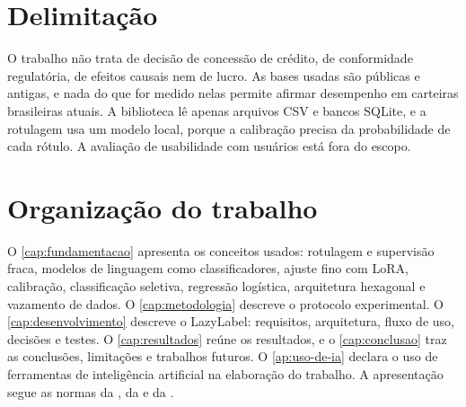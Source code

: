 \section{Delimitação}

O trabalho não trata de decisão de concessão de crédito, de conformidade regulatória, de efeitos causais nem de lucro. As bases usadas são públicas e antigas, e nada do que for medido nelas permite afirmar desempenho em carteiras brasileiras atuais. A biblioteca lê apenas arquivos CSV e bancos SQLite, e a rotulagem usa um modelo local, porque a calibração precisa da probabilidade de cada rótulo. A avaliação de usabilidade com usuários está fora do escopo.

\section{Organização do trabalho}

O \autoref{cap:fundamentacao} apresenta os conceitos usados: rotulagem e supervisão fraca, modelos de linguagem como classificadores, ajuste fino com LoRA, calibração, classificação seletiva, regressão logística, arquitetura hexagonal e vazamento de dados. O \autoref{cap:metodologia} descreve o protocolo experimental. O \autoref{cap:desenvolvimento} descreve o LazyLabel: requisitos, arquitetura, fluxo de uso, decisões e testes. O \autoref{cap:resultados} reúne os resultados, e o \autoref{cap:conclusao} traz as conclusões, limitações e trabalhos futuros. O \autoref{ap:uso-de-ia} declara o uso de ferramentas de inteligência artificial na elaboração do trabalho. A apresentação segue as normas da , da  e da .
